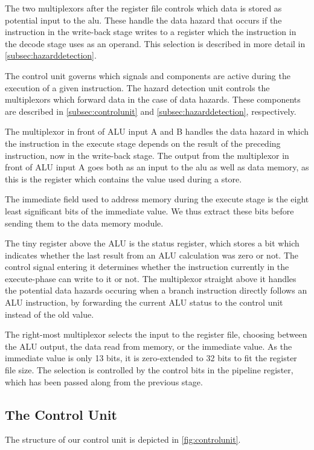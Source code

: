 \documentclass[11pt]{article}
\begin{document}
The two multiplexors after the register file controls which data is
stored as potential input to the alu. These handle the data hazard
that occurs if the instruction in the write-back stage writes to a
register which the instruction in the decode stage uses as an
operand. This selection is described in more detail in
\autoref{subsec:hazarddetection}. 

The control unit governs which signals and components are active
during the execution of a given instruction. The hazard detection unit
controls the multiplexors which forward data in the case of data
hazards. These components are described in
\autoref{subsec:controlunit} and \autoref{subsec:hazarddetection},
respectively.

The multiplexor in front of ALU input A and B handles the data hazard
in which the instruction in the execute stage depends on the result of
the preceding instruction, now in the write-back stage. The output
from the multiplexor in front of ALU input A goes both as an input to
the alu as well as data memory, as this is the register which contains
the value used during a store.

The immediate field used to address memory during the execute stage is
the eight least significant bits of the immediate value. We thus
extract these bits before sending them to the data memory module.

The tiny register above the ALU is the status register, which stores a
bit which indicates whether the last result from an ALU calculation
was zero or not. The control signal entering it determines whether the
instruction currently in the execute-phase can write to it or not. The
multiplexor straight above it handles the potential data hazards
occuring when a branch instruction directly follows an ALU
instruction, by forwarding the current ALU status to the control unit
instead of the old value.

The right-most multiplexor selects the input to the register file,
choosing between the ALU output, the data read from memory, or the
immediate value. As the immediate value is only 13 bits, it is
zero-extended to 32 bits to fit the register file size. The selection
is controlled by the control bits in the pipeline register, which has
been passed along from the previous stage.

\subsection{The Control Unit}
\label{subsec:controlunit} 
The structure of our control unit is depicted in
\autoref{fig:controlunit}.
\end{document}
